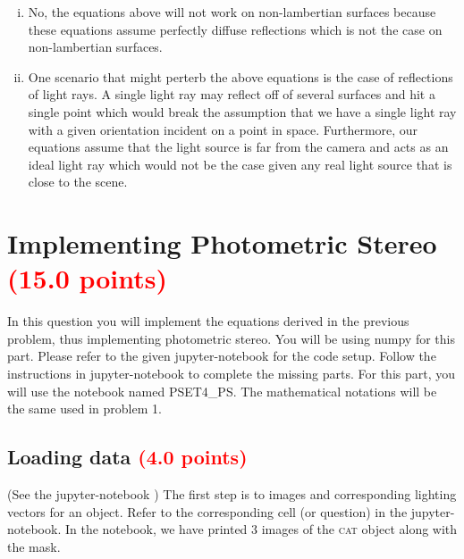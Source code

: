 \documentclass[answers]{exam}
\newcommand{\mypoints}[1]{\textcolor{red}{(#1 points)}}
\begin{document}
\begin{solution}
\begin{enumerate}[i)]
    \item No, the equations above will not work on non-lambertian surfaces because these equations assume perfectly diffuse reflections which is not the case on non-lambertian surfaces.
    \item One scenario that might perterb the above equations is the case of reflections of light rays. A single light ray may reflect off of several surfaces and hit a single point which would break 
    the assumption that we have a single light ray with a given orientation incident on a point in space. Furthermore, our equations assume that the light source is far from the camera and acts as an ideal light ray which would not be the case given any real light source that is close to the scene.
\end{enumerate}
\end{solution}


\newpage
\section{Implementing Photometric Stereo \mypoints{15.0}} 

In this question you will implement the equations derived in the previous problem, thus implementing photometric stereo. You will be using numpy for this part. Please refer to the given jupyter-notebook for the code setup. Follow the instructions in jupyter-notebook to complete the missing parts. For this part, you will use the notebook named PSET4\_PS. The mathematical notations will be the same used in problem 1.   

\subsection{Loading data \mypoints{4.0}}
(See the jupyter-notebook ) The first step is to images and corresponding lighting vectors for an object. Refer to the corresponding cell (or question) in the jupyter-notebook. In the notebook, we have printed 3 images of the \textsc{cat} object along with the mask. \\
\end{document}
